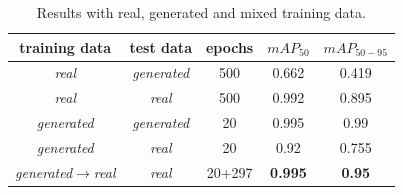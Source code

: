 \begin{table}
    \caption{Results with real, generated and mixed training data. }\label{tab:results}
    \begin{tabularx}{\linewidth}{|C|C|C|C|C|}
        \hline
        training data & test data & epochs & $mAP_{50}$ & $mAP_{50-95}$\\
        \hline
        \textit{real} & \textit{generated} & 500 & 0.662 & 0.419 \\
        \textit{real} &  \textit{real} & 500 & 0.992 & 0.895\\
        \textit{generated} & \textit{generated} & 20 & 0.995 & 0.99 \\
        \textit{generated} &  \textit{real} & 20 & 0.92 & 0.755 \\
        \textit{generated$\rightarrow$real} & \textit{real} & 20+297 & \textbf{0.995} & \textbf{0.95}\\
        \hline
    \end{tabularx}
\end{table}




